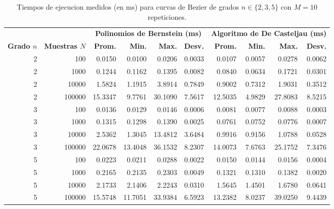 \begin{table}[H]
\centering
\caption{Tiempos de ejecucion medidos (en ms) para curvas de Bezier de grados $n \in \{2, 3, 5\}$ con $M = 10$ repeticiones.}
\label{tab:exp_tiempos_bajos}
\footnotesize
\begin{tabular}{rr rrrr rrrr}
\toprule
& & \multicolumn{4}{c}{\textbf{Polinomios de Bernstein (ms)}} & \multicolumn{4}{c}{\textbf{Algoritmo de De Casteljau (ms)}} \\
\cmidrule(lr){3-6} \cmidrule(lr){7-10}
\textbf{Grado $n$} & \textbf{Muestras $N$} & \textbf{Prom.} & \textbf{Min.} & \textbf{Max.} & \textbf{Desv.} & \textbf{Prom.} & \textbf{Min.} & \textbf{Max.} & \textbf{Desv.} \\
\midrule
2 & 100    & 0.0150 & 0.0100 & 0.0206 & 0.0033 & 0.0107 & 0.0057 & 0.0278 & 0.0062 \\
2 & 1000   & 0.1244 & 0.1162 & 0.1395 & 0.0082 & 0.0840 & 0.0634 & 0.1721 & 0.0301 \\
2 & 10000  & 1.5824 & 1.1915 & 3.8914 & 0.7849 & 0.9002 & 0.7312 & 1.9031 & 0.3512 \\
2 & 100000 & 15.3347 & 9.7761 & 30.1090 & 7.5617 & 12.5035 & 4.9829 & 27.8083 & 8.5215 \\
\midrule
3 & 100    & 0.0136 & 0.0129 & 0.0146 & 0.0006 & 0.0081 & 0.0077 & 0.0088 & 0.0003 \\
3 & 1000   & 0.1315 & 0.1298 & 0.1390 & 0.0025 & 0.0761 & 0.0752 & 0.0776 & 0.0007 \\
3 & 10000  & 2.5362 & 1.3045 & 13.4812 & 3.6484 & 0.9916 & 0.9156 & 1.0788 & 0.0528 \\
3 & 100000 & 22.0678 & 13.4048 & 36.1532 & 8.2307 & 14.0073 & 7.6763 & 25.1752 & 7.3476 \\
\midrule
5 & 100    & 0.0223 & 0.0211 & 0.0288 & 0.0022 & 0.0150 & 0.0144 & 0.0156 & 0.0004 \\
5 & 1000   & 0.2165 & 0.2135 & 0.2303 & 0.0049 & 0.1321 & 0.1310 & 0.1382 & 0.0020 \\
5 & 10000  & 2.1733 & 2.1406 & 2.2243 & 0.0310 & 1.5645 & 1.4501 & 1.6780 & 0.0641 \\
5 & 100000 & 15.5748 & 11.7051 & 33.9384 & 6.5923 & 13.2382 & 8.0237 & 39.0250 & 9.4439 \\
\bottomrule
\end{tabular}
\end{table}

